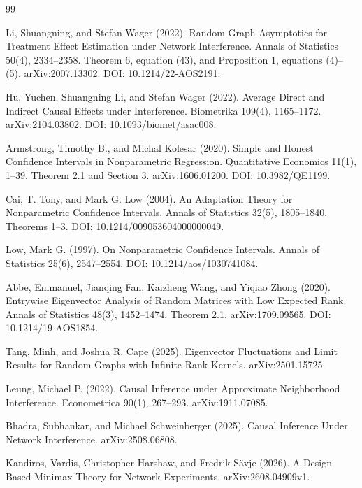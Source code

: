 \documentclass{article}
\begin{document}
\begin{thebibliography}{99}

   Li, Shuangning, and Stefan Wager (2022). Random Graph Asymptotics for Treatment Effect Estimation under Network Interference. Annals of Statistics 50(4), 2334--2358. Theorem 6, equation (43), and Proposition 1, equations (4)--(5). arXiv:2007.13302. DOI: 10.1214/22-AOS2191.

   Hu, Yuchen, Shuangning Li, and Stefan Wager (2022). Average Direct and Indirect Causal Effects under Interference. Biometrika 109(4), 1165--1172. arXiv:2104.03802. DOI: 10.1093/biomet/asac008.

   Armstrong, Timothy B., and Michal Kolesar (2020). Simple and Honest Confidence Intervals in Nonparametric Regression. Quantitative Economics 11(1), 1--39. Theorem 2.1 and Section 3. arXiv:1606.01200. DOI: 10.3982/QE1199.

   Cai, T. Tony, and Mark G. Low (2004). An Adaptation Theory for Nonparametric Confidence Intervals. Annals of Statistics 32(5), 1805--1840. Theorems 1--3. DOI: 10.1214/009053604000000049.

   Low, Mark G. (1997). On Nonparametric Confidence Intervals. Annals of Statistics 25(6), 2547--2554. DOI: 10.1214/aos/1030741084.

   Abbe, Emmanuel, Jianqing Fan, Kaizheng Wang, and Yiqiao Zhong (2020). Entrywise Eigenvector Analysis of Random Matrices with Low Expected Rank. Annals of Statistics 48(3), 1452--1474. Theorem 2.1. arXiv:1709.09565. DOI: 10.1214/19-AOS1854.

   Tang, Minh, and Joshua R. Cape (2025). Eigenvector Fluctuations and Limit Results for Random Graphs with Infinite Rank Kernels. arXiv:2501.15725.

   Leung, Michael P. (2022). Causal Inference under Approximate Neighborhood Interference. Econometrica 90(1), 267--293. arXiv:1911.07085.

   Bhadra, Subhankar, and Michael Schweinberger (2025). Causal Inference Under Network Interference. arXiv:2508.06808.

   Kandiros, Vardis, Christopher Harshaw, and Fredrik Sävje (2026). A Design-Based Minimax Theory for Network Experiments. arXiv:2608.04909v1.


\end{thebibliography}
\end{document}
